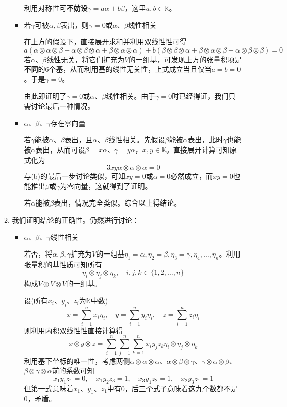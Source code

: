 \documentclass[a4paper,UTF8,fontset=windows,AutoFakeBold]{ctexart}
\begin{document}
\begin{enumerate}
\begin{enumerate}
\begin{itemize}
            利用对称性可\textbf{不妨设}$\gamma=a\alpha+b\beta$，这里$a,b\in\mathbb{K}$。

            \item 若$\gamma$可被$\alpha,\beta$表出，则$\gamma=0$或$\alpha$、$\beta$线性相关
            
            在上方的假设下，直接展开求和并利用双线性性可得
            $$a(\alpha\otimes\alpha\otimes\beta+\alpha\otimes\beta\otimes\alpha+\beta\otimes\alpha\otimes\alpha)+b(\beta\otimes\beta\otimes\alpha+\beta\otimes\alpha\otimes\beta+\alpha\otimes\beta\otimes\beta)=0$$
            若$\alpha$、$\beta$线性无关，将它们扩充为$V$的一组基，可发现上方的张量积项是\textbf{不同}的6个基，从而利用基的线性无关性，上式成立当且仅当$a=b=0$。于是$\gamma=0$。

            由此即证明了$\gamma=0$或$\alpha$、$\beta$线性相关。由于$\gamma=0$时已经得证，我们只需讨论最后一种情况。

            \item $\alpha$、$\beta$、$\gamma$存在零向量
            
            若$\gamma$能被$\alpha$、$\beta$表出，且$\alpha$、$\beta$线性相关。先假设$\beta$能被$\alpha$表出，此时$\gamma$也能被$\alpha$表出，从而可设$\beta=x\alpha$、$\gamma=y\alpha$，$x,y\in\mathbb{K}$。直接展开计算可知原式化为
            $$3xy\alpha\otimes\alpha\otimes\alpha=0$$
            与(b)的最后一步讨论类似，可知$xy=0$或$\alpha=0$必然成立，而$xy=0$也能推出$\beta$或$\gamma$为零向量，这就得到了证明。
            
            若$\alpha$能被$\beta$表出，情况完全类似。综合以上得结论。
        \end{itemize}

        \item 
        我们证明结论的正确性。仍然进行讨论：
        \begin{itemize}
            \item $\alpha$、$\beta$、$\gamma$线性相关
            
            若否，将$\alpha,\beta,\gamma$扩充为$V$的一组基$\eta_1=\alpha,\eta_2=\beta,\eta_3=\gamma,\eta_4,\dots,\eta_n$。利用张量积的基性质可知所有
            $$\eta_i\otimes\eta_j\otimes\eta_k,\quad i,j,k\in\{1,2,\dots,n\}$$
            构成$V\otimes V\otimes V$的一组基。
            
            设(所有$x_i$、$y_i$、$z_i$为$\mathbb{K}$中数)
            $$x=\sum_{i=1}^nx_i\eta_i,\quad y=\sum_{i=1}^ny_i\eta_i,\quad z=\sum_{i=1}^nz_i\eta_i$$
            则利用内积双线性性直接计算得
            $$x\otimes y\otimes z=\sum_{i=1}^n\sum_{j=1}^n\sum_{k=1}^nx_iy_jz_k\eta_i\otimes\eta_j\otimes\eta_k$$
            利用基下坐标的唯一性，考虑两侧$\alpha\otimes\alpha\otimes\alpha$、$\alpha\otimes\beta\otimes\gamma$、$\gamma\otimes\alpha\otimes\beta$、$\beta\otimes\gamma\otimes\alpha$前的系数可知
            $$x_1y_1z_1=0,\quad x_1y_2z_3=1,\quad x_3y_1z_2=1,\quad x_2y_3z_1=1$$
            但第一式意味着$x_1$、$y_1$、$z_1$中有0，后三个式子意味着这九个数都不是0，矛盾。


\end{itemize}
\end{enumerate}
\end{enumerate}
\end{document}
